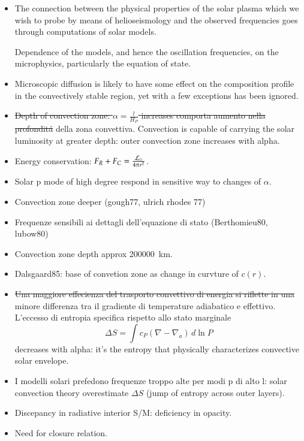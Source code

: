 \documentclass[../main.tex]{subfiles}
\begin{document}
{\begin{itemize}
\item The connection between the physical properties of the solar plasma which we wish to probe by means of helioseismology and the observed frequencies goes through computations of solar models.

Dependence of the models, and hence the oscillation frequencies, on the microphysics, particularly the equation of state.

\item Microscopic diffusion is likely to have some effect on the composition profile in the convectively stable region, yet with a few exceptions has been ignored.

\item \sout{Depth of convection zone: $\alpha=\frac{l}{H_P}$ increases comporta aumento nella profondit\'a} della zona convettiva. Convection is capable of carrying the solar luminosity at greater depth: outer convection zone increases with alpha.
\item Energy conservation: $F_R+F_C=\frac{\mathcal{L}_{\odot}{}}{4\pi r^2}$.
\item Solar p mode of high degree respond in sensitive way to changes of $\alpha$.

\item Convection zone deeper (gough77, ulrich rhodes 77)
\item Frequenze sensibili ai dettagli dell'equazione di stato (Berthomieu80, lubow80)
\item Convection zone depth approx \SI{200000}{\kilo\meter}.
\item Dalsgaard85: base of convetion zone as change in curvture of $c(r)$.
\item \sout{Una maggiore effecienza del trasporto convettivo di energia si riflette in una} minore differenza tra il gradiente di temperature adiabatico e effettivo. L'eccesso di entropia specifica rispetto allo stato marginale
\begin{equation}
    \Delta S=\int c_P(\nabla-\nabla_a)\,d\ln{P}
\end{equation}
decreases with alpha: it's the entropy that physically characterizes convective solar envelope.
\item I modelli solari prefedono frequenze troppo alte per modi p di alto l: solar convection theory overestimate $\Delta S$ (jump of entropy across outer layers).
\item Discepancy in radiative interior S/M: deficiency in opacity.
\item Need for closure relation.


\end{itemize}}
\end{document}
